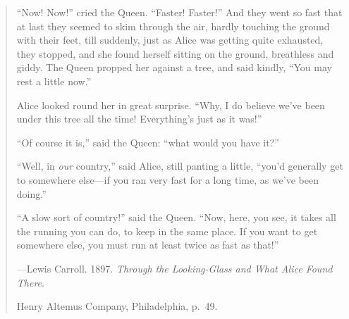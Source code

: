 

\cleardoublepage{}

\thispagestyle{empty} %

\vspace*{50 mm}

\small{}

\begin{quote}
	\protrudeleft``Now! Now!'' cried the Queen. 
	``Faster! Faster!'' 
	And they went so fast that at last they seemed to skim through the air, 
	hardly touching the ground with their feet, 
	till suddenly, 
	just as Alice was getting quite exhausted, 
	they stopped, 
	and she found herself sitting on the ground, 
	breathless and giddy. 
	The Queen propped her against a tree, and said kindly, 
	``You may rest a little now.''

	Alice looked round her in great surprise. 
	``Why, I do believe we've been under this tree all the time! 
	Everything's just as it was!''

	``Of course it is,'' said the Queen: ``what would you have it?'' %

	``Well, in \emph{our} country,'' said Alice, still panting a little, %
	``you'd generally get to somewhere else---if you ran very fast for a long time, 
	as we've been doing.''

	``A slow sort of country!'' said the Queen. 
	``Now, here, you see, it takes all the running you can do, to keep in the same place. 
	If you want to get somewhere else, you must run at least twice as fast as that!''

	\vspace{3 mm} %
	
		{%
		\setlength{\parskip}{0.0pt} %
		\hfill---Lewis Carroll. 1897.
				 \emph{Through the Looking-Glass and What Alice Found There}.
	
		\hfill Henry Altemus Company, Philadelphia, p.~49.}
\end{quote}

\normalsize{}




